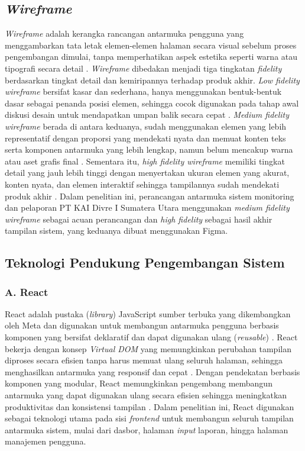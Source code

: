\subsection{\textit{Wireframe}} \label{II.Wireframe}
\textit{Wireframe} adalah kerangka rancangan antarmuka pengguna yang menggambarkan tata letak elemen-elemen halaman secara visual sebelum proses pengembangan dimulai, tanpa memperhatikan aspek estetika seperti warna atau tipografi secara detail \cite{koshelev2021unitarity}. \textit{Wireframe} dibedakan menjadi tiga tingkatan \textit{fidelity} berdasarkan tingkat detail dan kemiripannya terhadap produk akhir. \textit{Low fidelity wireframe} bersifat kasar dan sederhana, hanya menggunakan bentuk-bentuk dasar sebagai penanda posisi elemen, sehingga cocok digunakan pada tahap awal diskusi desain untuk mendapatkan umpan balik secara cepat \cite{koshelev2021unitarity}. \textit{Medium fidelity wireframe} berada di antara keduanya, sudah menggunakan elemen yang lebih representatif dengan proporsi yang mendekati nyata dan memuat konten teks serta komponen antarmuka yang lebih lengkap, namun belum mencakup warna atau aset grafis final \cite{koshelev2021unitarity}. Sementara itu, \textit{high fidelity wireframe} memiliki tingkat detail yang jauh lebih tinggi dengan menyertakan ukuran elemen yang akurat, konten nyata, dan elemen interaktif sehingga tampilannya sudah mendekati produk akhir \cite{koshelev2021unitarity}. Dalam penelitian ini, perancangan antarmuka sistem monitoring dan pelaporan PT KAI Divre I Sumatera Utara menggunakan \textit{medium fidelity wireframe} sebagai acuan perancangan dan \textit{high fidelity} sebagai hasil akhir tampilan sistem, yang keduanya dibuat menggunakan Figma. \par

\subsection{Teknologi Pendukung Pengembangan Sistem} \label{II.Teknologi}

\subsubsection*{A. React} \label{II.React}
React adalah pustaka (\textit{library}) JavaScript sumber terbuka yang dikembangkan oleh Meta dan digunakan untuk membangun antarmuka pengguna berbasis komponen yang bersifat deklaratif dan dapat digunakan ulang (\textit{reusable}) \cite{anggraeni2024react}. React bekerja dengan konsep \textit{Virtual DOM} yang memungkinkan perubahan tampilan diproses secara efisien tanpa harus memuat ulang seluruh halaman, sehingga menghasilkan antarmuka yang responsif dan cepat \cite{anggraeni2024react}. Dengan pendekatan berbasis komponen yang modular, React memungkinkan pengembang membangun antarmuka yang dapat digunakan ulang secara efisien sehingga meningkatkan produktivitas dan konsistensi tampilan \cite{anggraeni2024react}. Dalam penelitian ini, React digunakan sebagai teknologi utama pada sisi \textit{frontend} untuk membangun seluruh tampilan antarmuka sistem, mulai dari dasbor, halaman \textit{input} laporan, hingga halaman manajemen pengguna. \par

